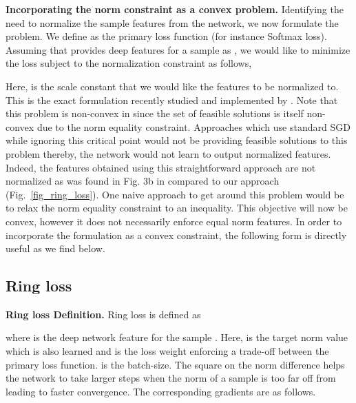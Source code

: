 \documentclass[10pt,twocolumn,letterpaper]{article}
\begin{document}
\textbf{ Incorporating the norm constraint as a convex problem.} Identifying the need to normalize the sample features from the network, we now formulate the problem. We define  as the primary loss function (for instance Softmax loss). Assuming that  provides deep features for a sample  as , we would like to minimize the loss subject to the normalization constraint as follows,

Here,  is the scale constant that we would like the features to be normalized to. This is the exact formulation recently studied and implemented by \cite{ranjan2017l2, Wang2017NormFace}. Note that this problem is non-convex in  since the set of feasible solutions is itself non-convex due to the norm equality constraint. Approaches which use standard SGD while ignoring this critical point would not be providing feasible solutions to this problem thereby, the network  would not learn to output normalized features. Indeed, the features obtained using this straightforward approach are not normalized as was found in Fig. 3b in \cite{ranjan2017l2} compared to our approach (Fig.~\ref{fig_ring_loss}). One naive approach to get around this problem would be to relax the norm equality constraint to an inequality. This objective will now be convex, however it does not necessarily enforce equal norm features. In order to incorporate the formulation as a convex constraint, the following form is directly useful as we find below.














\subsection{Ring loss}


\textbf{Ring loss Definition. } Ring loss  is defined as

where  is the deep network feature for the sample .  Here,  is the target norm value which is also learned and  is the loss weight enforcing a trade-off between the primary loss function.  is the batch-size. The square on the norm difference helps the network to take larger steps when the norm of a sample is too far off from  leading to faster convergence. The corresponding gradients are as follows.
\end{document}
